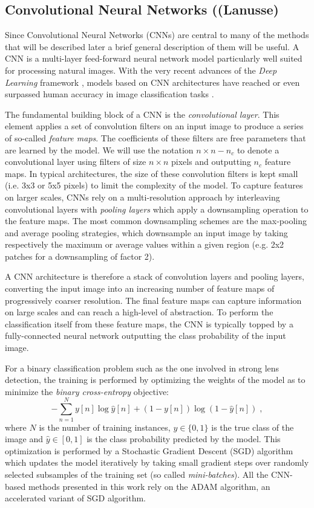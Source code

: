 \documentclass[useAMS,usenatbib]{mnras}
\begin{document}
\subsection{Convolutional Neural Networks ((Lanusse)}
Since Convolutional Neural Networks (CNNs) are central to many of the methods that will be described later a brief general description of them will be useful.
A CNN \citep{Lecun1998} is a multi-layer feed-forward neural network model particularly well suited for processing natural images. With the very recent advances of the \textit{Deep Learning} framework \citep{Lecun2015}, models based on CNN architectures have reached or even surpassed human accuracy in image classification tasks \citep{He2015a}.

The fundamental building block of a CNN is the \textit{convolutional layer}. This element applies a set of convolution filters on an input image to produce a series of so-called \textit{feature maps}. The coefficients of these filters are free parameters that are learned by the model. We will use the notation 
$n \times n - n_c$ to denote a convolutional layer using filters of size $n \times n$ pixels and outputting $n_c$ feature maps.  In typical architectures, the size of these convolution filters is kept small (i.e. 3x3 or 5x5 pixels) to limit the complexity of the model. To capture features on larger scales, CNNs rely on a multi-resolution approach by interleaving convolutional layers with \textit{pooling layers} which apply a downsampling operation to the feature maps. The most common downsampling schemes are the max-pooling and average pooling strategies, which downsample an input image by taking respectively the maximum or average values within a given region (e.g. 2x2 patches for a downsampling of factor 2).

A CNN architecture is therefore a stack of convolution layers and pooling layers, converting the input image into an increasing number of feature maps of progressively coarser resolution. The final feature maps can capture information on large scales and can reach a high-level of abstraction. To perform the classification itself from these feature maps, the CNN is typically topped by a fully-connected neural network outputting the class probability of the input image.

For a binary classification problem such as the one involved in strong lens detection, the training is performed by optimizing the weights of the model as to minimize the \textit{binary cross-entropy} objective:
\begin{equation}
	- \sum_{n=1}^{N} y[n] \log \hat{y}[n] + (1 - y[n])\log(1 - \hat{y}[n]) \;,
\end{equation}
where $N$ is the number of training instances, $y \in \{0,1\}$ is the true class of the image and $\hat{y} \in [0,1]$ is the class probability predicted by the model. This optimization is performed by a Stochastic Gradient Descent (SGD) algorithm which updates the model iteratively by taking small gradient steps over randomly selected subsamples of the training set (so called \textit{mini-batches}). All the CNN-based methods presented in this work rely on the ADAM \citep{Kingma_2014} algorithm, an accelerated variant of SGD algorithm.
\end{document}
